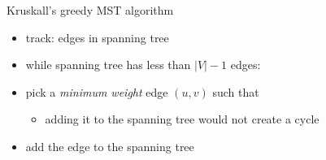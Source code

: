 \begin{frame}{Kruskall's greedy MST algorithm}
    \begin{itemize}
    \item track: edges in spanning tree
    \vspace{.5cm}
    \item while spanning tree has less than $|V|-1$ edges:
    \item pick a \textit{minimum weight} edge $(u, v)$ such that
        \begin{itemize}
        \item adding it to the spanning tree would not create a cycle
        \end{itemize}
    \item add the edge to the spanning tree
    \end{itemize}
\end{frame}
